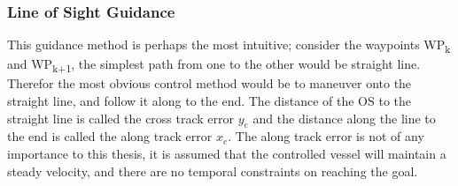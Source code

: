 \subsubsection*{Line of Sight Guidance} \label{CHAP: LOS GUIDANCE} %

This guidance method is perhaps the most intuitive; consider the waypoints WP\textsubscript{k} and WP\textsubscript{k+1}, the simplest path
from one to the other would be straight line. Therefor the most obvious control method would be to maneuver onto the straight line, and
follow it along to the end. The distance of the \gls{OS} to the straight line is called the cross track error $y_e$ and the distance along the line
to the end is called the along track error $x_e$. The along track error is not of any importance to this thesis, it is assumed that the controlled
vessel will maintain a steady velocity, and there are no temporal constraints on reaching the goal.

